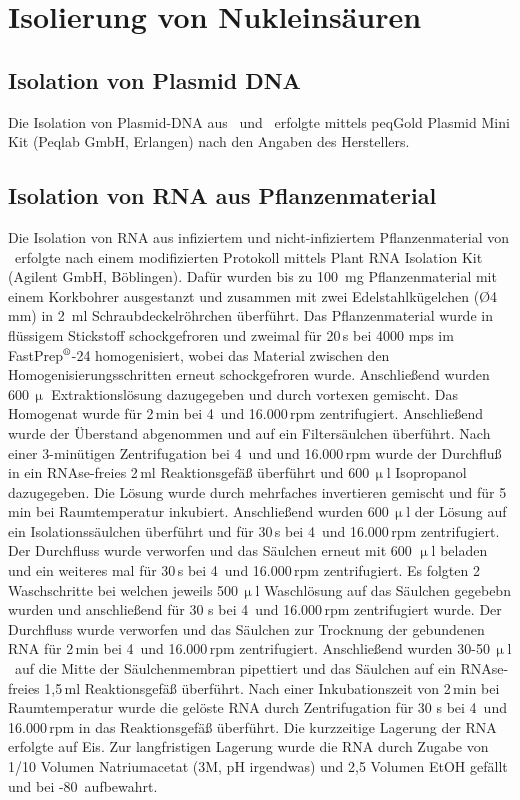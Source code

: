 \section{Isolierung von Nukleinsäuren}
\subsection{Isolation von Plasmid DNA}
Die Isolation von Plasmid-DNA aus \Ecoli\ und \Atumefaciens\ erfolgte mittels peqGold Plasmid Mini Kit (Peqlab GmbH, Erlangen) nach den Angaben des Herstellers. 
\subsection{Isolation von RNA aus Pflanzenmaterial}\label{sec:RNA-Pflanze}
Die Isolation von RNA aus infiziertem und nicht-infiziertem Pflanzenmaterial von \Gmax\ erfolgte nach einem modifizierten Protokoll mittels Plant RNA Isolation Kit (Agilent GmbH, Böblingen). Dafür wurden bis zu 100\, mg Pflanzenmaterial mit einem Korkbohrer ausgestanzt und zusammen mit zwei Edelstahlkügelchen (\O 4\,mm) in 2\, ml Schraubdeckelröhrchen überführt. Das Pflanzenmaterial wurde in flüssigem Stickstoff schockgefroren und zweimal für 20\,s bei 4000 \acs{mps} im FastPrep$\textsuperscript{\textregistered}$-24 homogenisiert, wobei das Material zwischen den Homogenisierungsschritten erneut schockgefroren wurde. Anschließend wurden 600\,$\upmu$ Extraktionslösung dazugegeben und durch vortexen gemischt. Das Homogenat wurde für 2\,min bei 4\celcius\ und 16.000\,rpm zentrifugiert. Anschließend wurde der Überstand abgenommen und auf ein Filtersäulchen überführt. Nach einer 3-minütigen Zentrifugation bei 4\celcius\ und und 16.000\,rpm wurde der Durchfluß in ein RNAse-freies 2\,ml Reaktionsgefäß überführt und 600\,$\upmu$l Isopropanol dazugegeben. Die Lösung wurde durch mehrfaches invertieren gemischt und für 5\,min bei Raumtemperatur inkubiert. Anschließend wurden 600\,$\upmu$l der Lösung auf ein Isolationssäulchen überführt und für 30\,s bei  4\celcius\ und 16.000\,rpm zentrifugiert. Der Durchfluss wurde verworfen und das Säulchen erneut mit 600 $\upmu$l beladen und ein weiteres mal für 30\,s bei  4\celcius\ und 16.000\,rpm zentrifugiert. Es folgten 2 Waschschritte bei welchen jeweils 500\,$\upmu$l Waschlösung auf das Säulchen gegebebn wurden und anschließend für 30 s bei  4\celcius\ und 16.000\,rpm zentrifugiert wurde. Der Durchfluss wurde verworfen und das Säulchen zur Trocknung der gebundenen RNA für 2\,min bei 4\celcius\ und 16.000\,rpm zentrifugiert. Anschließend wurden 30-50\,$\upmu$l \depcwasser\ auf die Mitte der Säulchenmembran pipettiert und das Säulchen auf ein RNAse-freies 1,5\,ml Reaktionsgefäß überführt. Nach einer Inkubationszeit von 2\,min bei Raumtemperatur wurde die gelöste RNA durch Zentrifugation für 30 s bei  4\celcius\ und 16.000\,rpm in das Reaktionsgefäß überführt. Die kurzzeitige Lagerung der RNA erfolgte auf Eis. Zur langfristigen Lagerung wurde die RNA durch Zugabe von 1/10 Volumen Natriumacetat (3M, pH irgendwas) und 2,5 Volumen EtOH gefällt und bei -80\celcius\ aufbewahrt. 

